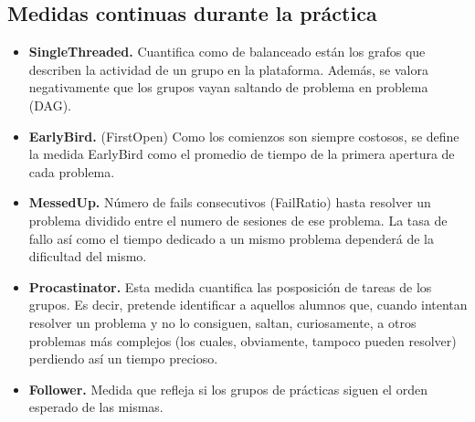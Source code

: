 \subsection{Medidas continuas durante la práctica}

\begin{itemize}
\item \textbf{SingleThreaded.} Cuantifica como de balanceado están los grafos que describen la actividad de un grupo en la plataforma. Además, se valora negativamente que los grupos vayan saltando de problema en problema (DAG).
\item \textbf{EarlyBird.} (FirstOpen) Como los comienzos son siempre costosos, se define  la medida EarlyBird como el promedio de tiempo de la primera apertura de cada problema.
\item \textbf{MessedUp.} Número de fails consecutivos (FailRatio) hasta resolver un problema dividido entre el numero de sesiones de ese problema. La tasa de fallo así como el tiempo dedicado a un mismo problema dependerá de la dificultad del mismo.
\item \textbf{Procastinator.} Esta medida cuantifica las posposición de tareas de los grupos. Es decir, pretende identificar a aquellos alumnos que, cuando intentan resolver un problema y no lo consiguen, saltan, curiosamente, a otros problemas más complejos (los cuales, obviamente, tampoco pueden resolver) perdiendo así un tiempo precioso.
\item \textbf{Follower.} Medida que refleja si los grupos de prácticas siguen el orden esperado de las mismas.
\end{itemize}